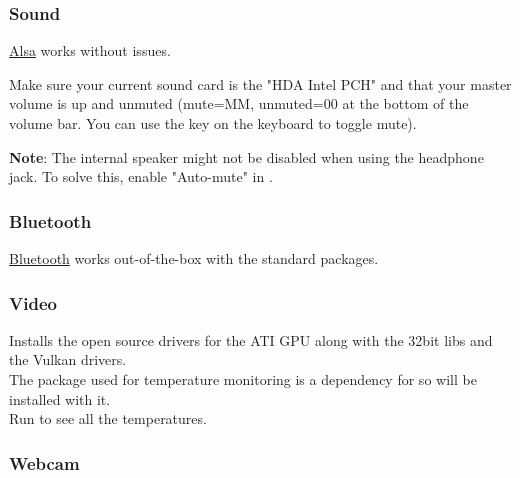 \subsubsection{Sound}

\href{https://wiki.archlinux.org/index.php/ALSA}{Alsa} works without issues.

\begin{blocksection}
    Make sure your current sound card is the "HDA Intel PCH" and that your master volume is up and unmuted (mute=MM, unmuted=00 at the bottom of the volume bar. You can use the  key on the keyboard to toggle mute).
\end{blocksection}


\textbf{Note}: The internal speaker might not be disabled when using the headphone jack. To solve this, enable "Auto-mute" in .

\subsubsection{Bluetooth}

\href{https://wiki.archlinux.org/index.php/Bluetooth}{Bluetooth} works out-of-the-box with the standard packages.


\subsubsection{Video}
\begin{blocksection}
    Installs the open source drivers for the ATI GPU along with the 32bit libs and the Vulkan drivers.\\
    The \href{https://wiki.archlinux.org/index.php/Lm_sensors}{} package used for temperature monitoring is a dependency for  so will be installed with it.\\
    Run  to see all the temperatures.
\end{blocksection}

\subsubsection{Webcam}

